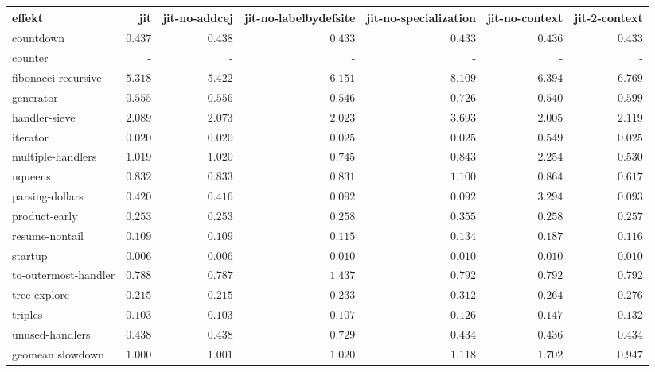 \begin{tabular}{l r r r r r r}
\toprule effekt & jit & jit-no-addcej & jit-no-labelbydefsite & jit-no-specialization & jit-no-context & jit-2-context \\
\midrule
countdown & $0.437$ & $0.438$ & $0.433$ & $\mathbf{0.433}$ & $0.436$ & $0.433$ \\
counter & - & - & - & - & - & - \\
fibonacci-recursive & $\mathbf{5.318}$ & $5.422$ & $6.151$ & $8.109$ & $6.394$ & $6.769$ \\
generator & $0.555$ & $0.556$ & $0.546$ & $0.726$ & $\mathbf{0.540}$ & $0.599$ \\
handler-sieve & $2.089$ & $2.073$ & $2.023$ & $3.693$ & $\mathbf{2.005}$ & $2.119$ \\
iterator & $0.020$ & $\mathbf{0.020}$ & $0.025$ & $0.025$ & $0.549$ & $0.025$ \\
multiple-handlers & $1.019$ & $1.020$ & $0.745$ & $0.843$ & $2.254$ & $\mathbf{0.530}$ \\
nqueens & $0.832$ & $0.833$ & $0.831$ & $1.100$ & $0.864$ & $\mathbf{0.617}$ \\
parsing-dollars & $0.420$ & $0.416$ & $\mathbf{0.092}$ & $0.092$ & $3.294$ & $0.093$ \\
product-early & $0.253$ & $\mathbf{0.253}$ & $0.258$ & $0.355$ & $0.258$ & $0.257$ \\
resume-nontail & $\mathbf{0.109}$ & $0.109$ & $0.115$ & $0.134$ & $0.187$ & $0.116$ \\
startup & $0.006$ & $\mathbf{0.006}$ & $0.010$ & $0.010$ & $0.010$ & $0.010$ \\
to-outermost-handler & $0.788$ & $\mathbf{0.787}$ & $1.437$ & $0.792$ & $0.792$ & $0.792$ \\
tree-explore & $\mathbf{0.215}$ & $0.215$ & $0.233$ & $0.312$ & $0.264$ & $0.276$ \\
triples & $\mathbf{0.103}$ & $0.103$ & $0.107$ & $0.126$ & $0.147$ & $0.132$ \\
unused-handlers & $0.438$ & $0.438$ & $0.729$ & $0.434$ & $0.436$ & $\mathbf{0.434}$ \\
\midrule
 geomean slowdown & $1.000$ & $1.001$ & $1.020$ & $1.118$ & $1.702$ & $0.947$ \\
\bottomrule
\end{tabular}